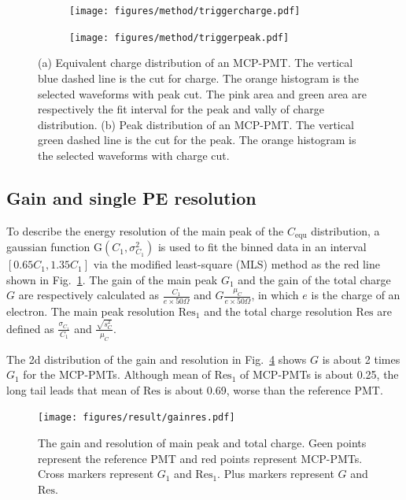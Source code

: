\begin{figure}[!htbp]
    \centering
    \begin{subfigure}[b]{\SF\textwidth}
        \texttt{[image: figures/method/triggercharge.pdf]}
        \caption{}%
        \label{fig:triggercharge}
    \end{subfigure}
    \begin{subfigure}[b]{\SF\textwidth}
        \texttt{[image: figures/method/triggerpeak.pdf]}
        \caption{}%
        \label{fig:triggerpeak}
    \end{subfigure}
    \caption{(a) Equivalent charge distribution of an MCP-PMT. The vertical blue dashed line is the cut for charge. The orange histogram is the selected waveforms with peak cut. The pink area and green area are respectively the fit interval for the peak and vally of charge distribution. (b) Peak distribution of an MCP-PMT. The vertical green dashed line is the cut for the peak. The orange histogram is the selected waveforms with charge cut.}
\end{figure}

\subsection{Gain and single PE resolution}
\label{sec:noisegain}

To describe the energy resolution of the main peak of the $C_{\mathrm{equ}}$ distribution, a gaussian function G$(C_1,\sigma^2_{C_1})$ is used to fit the binned data in an interval $[0.65C_1, 1.35C_1]$ via the modified least-square (MLS) method \cite{Cowan1998StatisticalDA} as the red line shown in Fig.~\ref{fig:triggercharge}. The gain of the main peak $G_1$ and the gain of the total charge $G$ are respectively calculated as $\frac{C_1}{e\times 50\Omega}$ and $G\frac{\mu_{C}}{e\times 50\Omega}$, in which $e$ is the charge of an electron. The main peak resolution $\mathrm{Res}_1$ and the total charge resolution $\mathrm{Res}$ are defined as $\frac{\sigma_{C_1}}{C_1}$ and $\frac{\sqrt{s^2_{C}}}{\mu_{C}}$.

The 2d distribution of the gain and resolution in Fig.~\ref{fig:totalchargeCompare} shows $G$ is about 2 times $G_1$ for the MCP-PMTs. Although mean of $\mathrm{Res}_1$ of MCP-PMTs is about 0.25, the long tail leads that mean of $\mathrm{Res}$ is about 0.69, worse than the reference PMT.

\begin{figure}[!htbp]
    \centering
    \texttt{[image: figures/result/gainres.pdf]}
    \caption{The gain and resolution of main peak and total charge. Geen points represent the reference PMT and red points represent MCP-PMTs. Cross markers represent $G_1$ and $\mathrm{Res}_1$. Plus markers represent $G$ and $\mathrm{Res}$.}
    \label{fig:totalchargeCompare}
\end{figure}


